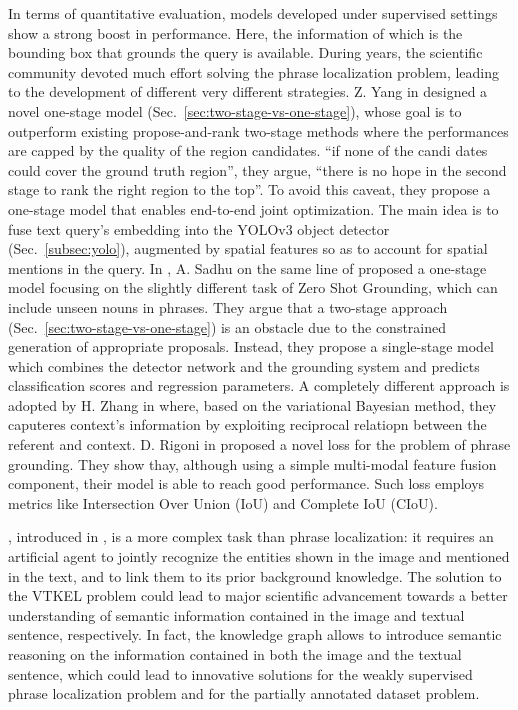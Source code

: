 In terms of quantitative evaluation, models developed under supervised
settings show a strong boost in performance. Here, the information of
which is the bounding box that grounds the query is available. During
years, the scientific community devoted much effort solving the phrase
localization problem, leading to the development of different very
different strategies. Z. Yang \etal{} in \cite{yang2019fast} designed
a novel one-stage model (Sec.~\ref{sec:two-stage-vs-one-stage}), whose
goal is to outperform existing propose-and-rank two-stage methods
where the performances are capped by the quality of the region
candidates. ``if none of the candi dates could cover the ground truth
region'', they argue, ``there is no hope in the second stage to rank
the right region to the top''. To avoid this caveat, they propose a
one-stage model that enables end-to-end joint optimization. The main
idea is to fuse text query's embedding into the YOLOv3 object detector
(Sec.~\ref{subsec:yolo}), augmented by spatial features so as to
account for spatial mentions in the query. In \cite{sadhu2019zero}, A.
Sadhu \etal{} on the same line of \cite{yang2019fast} proposed a
one-stage model focusing on the slightly different task of Zero Shot
Grounding, which can include unseen nouns in phrases. They argue that
a two-stage approach (Sec.~\ref{sec:two-stage-vs-one-stage}) is an
obstacle due to the constrained generation of appropriate proposals.
Instead, they propose a single-stage model which combines the detector
network and the grounding system and predicts classification scores
and regression parameters. A completely different approach is adopted
by H. Zhang \etal{} in \cite{zhang2018grounding} where, based on the
variational Bayesian method, they caputeres context's information by
exploiting reciprocal relatiopn between the referent and context. D.
Rigoni \etal{} in \cite{rigoni2021better} proposed a novel loss for
the problem of phrase grounding. They show thay, although using a
simple multi-modal feature fusion component, their model is able to
reach good performance. Such loss employs metrics like Intersection
Over Union (IoU) and Complete IoU (CIoU).

, introduced in
, is a more complex task than phrase
localization: it requires an artificial agent to jointly recognize the
entities shown in the image and mentioned in the text, and to link
them to its prior background knowledge. The solution to the VTKEL
problem could lead to major scientific advancement towards a better
understanding of semantic information contained in the image and
textual sentence, respectively. In fact, the knowledge graph allows to
introduce semantic reasoning on the information contained in both the
image and the textual sentence, which could lead to innovative
solutions for the weakly supervised phrase localization problem and
for the partially annotated dataset problem.

